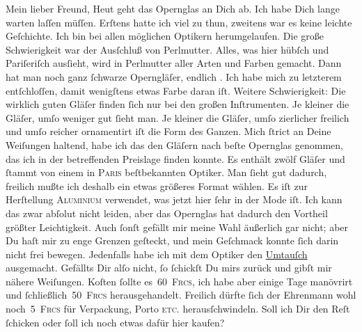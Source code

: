 \pstart\center{}Mein lieber Freund,\pend\vspace{0.5em}
\pstart
           Heut geht das Opernglas an Dich ab. Ich habe Dich
               lange warten laſſen müſſen. Erſtens hatte ich viel zu thun, zweitens war es keine
               leichte Geſchichte. Ich bin bei allen möglichen Optikern herumgelaufen. Die große
               Schwierigkeit war der Ausſchluß von Perlmutter. Alles, was hier hübſch und Pariſeriſch ausſieht, wird in Perlmutter aller
               Arten und Farben gemacht. Dann hat man noch ganz{ }ſchwarze {\pb}Operngläſer, endlich \label{K_L02762-1v}\label{K_L02762-1}. Ich habe mich zu letzterem entſchloſſen, damit wenigſtens
               etwas Farbe daran iſt. Weitere Schwierigkeit: Die wirklich guten Gläſer finden{ }ſich
               nur bei den großen Inſtrumenten. Je kleiner die Gläſer, umſo weniger gut{ }ſieht man.
               Je kleiner die Gläſer, umſo zierlicher freilich und umſo reicher ornamentirt iſt die
               Form des Ganzen. Mich{ }ſtrict an Deine Weiſungen haltend, habe ich das den Gläſern {\pb}nach beſte Opernglas genommen, das ich in  der betreffenden Preislage finden konnte. Es enthält
               zwölf Gläſer und{ }ſtammt von einem in \textsc{Paris} beſtbekannten Optiker.  Man{ }ſieht gut dadurch, freilich mußte ich deshalb ein etwas größeres Format wählen. Es
               iſt zur Herſtellung \textsc{Aluminium} verwendet, was jetzt hier{ }ſehr in der Mode iſt. Ich kann das zwar abſolut nicht leiden, aber das Opernglas hat
               dadurch den Vortheil {\pb}größter Leichtigkeit. Auch{ }ſonſt gefällt mir meine Wahl äußerlich gar nicht; 
               aber Du haſt mir zu enge Grenzen geſteckt, und mein Geſchmack konnte{ }ſich darin nicht
               frei bewegen. Jedenfalls habe ich mit dem Optiker den \uline{Umtauſch} ausgemacht. Gefällts Dir alſo nicht,{ }ſo{ }ſchickſt Du mirs zurück und
               gibſt mir nähere Weiſungen. Koſten{ }ſollte es 60 \textsc{Frcs}, ich
               habe aber einige Tage {\pb}manövrirt und{ }ſchließlich 50 \textsc{Frcs} herausgehandelt. Freilich dürfte{ }ſich der Ehrenmann wohl noch 5 \textsc{Frcs} für Verpackung, Porto
                  \textsc{etc.} herausſchwindeln. Soll ich Dir den Reſt{ }ſchicken
               oder{ }ſoll ich noch etwas dafür hier kaufen?\pend
           
